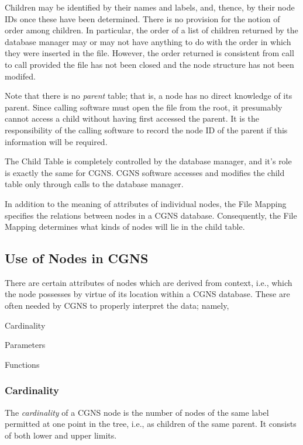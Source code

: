 Children may be identified by their names and labels, and, thence,
by their node IDs once these have been determined. There is no provision
for the notion of order among children. In particular, the order of a
list of children returned by the database manager may or may not have
anything to do with the order in which they
were inserted in the file. However, the order returned is consistent
from call to call provided the file has not been closed and the node
structure has not been modifed.

Note that there is no \emph{parent} table; that is, a node has no direct
knowledge of its parent. Since calling software must open the file
from the root, it presumably cannot access a child without having
first accessed the parent.  It is the responsibility of the calling
software to record the node ID of the parent if this information will be
required.

The Child Table is completely controlled by the database manager,
and it's role is exactly the same for CGNS. CGNS software accesses and
modifies the child table only through calls to the database manager.

In addition to the meaning of attributes of individual nodes,
the File Mapping specifies the relations between nodes in a CGNS
database. Consequently, the File Mapping determines what kinds of nodes
will lie in the child table.

\subsection{Use of Nodes in CGNS}
\label{s:nodeuse}

There are certain attributes of nodes which are
derived from context, i.e., which the node possesses by virtue of its
location within a CGNS database. These are often needed by CGNS to
properly interpret the data; namely,

\begin{itemize*}
\item Cardinality
\item Parameters
\item Functions
\end{itemize*}

\subsubsection{Cardinality}
\label{s:cardinality}

The \emph{cardinality} of a CGNS node is the number of nodes of the same
label permitted at one point in the tree, i.e., as children of the same
parent. It consists of both lower and upper limits.

